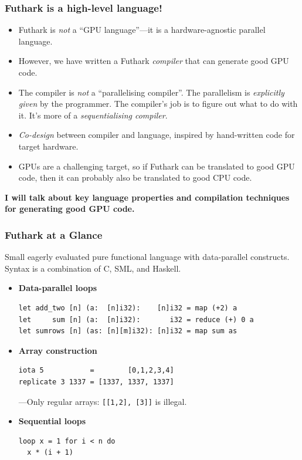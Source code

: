 \documentclass[rgb,dvipsnames]{beamer}
\begin{document}
\begin{frame}
  \frametitle{Futhark is a high-level language!}

  \begin{itemize}
  \item Futhark is \textit{not} a ``GPU language''---it is a
    hardware-agnostic parallel language.
  \item However, we have written a Futhark \textit{compiler} that can
    generate good GPU code.
  \item The compiler is \textit{not} a ``parallelising compiler''.
    The parallelism is \textit{explicitly given} by the programmer.
    The compiler's job is to figure out what to do with it.  It's more
    of a \textit{sequentialising compiler}.
  \item \textit{Co-design} between compiler and language, inspired by
    hand-written code for target hardware.
  \item GPUs are a challenging target, so if Futhark can be translated
    to good GPU code, then it can probably also be translated to good
    CPU code.
  \end{itemize}

  \textbf{I will talk about key language properties and compilation
    techniques for generating good GPU code.}
\end{frame}


\begin{frame}[fragile]
  \frametitle{Futhark at a Glance}

  Small eagerly evaluated pure functional language with data-parallel
  constructs.  Syntax is a combination of C, SML, and Haskell.

  \begin{itemize}
  \item\textbf{Data-parallel loops}
\begin{lstlisting}[xleftmargin=-1cm]
let add_two [n] (a:  [n]i32):    [n]i32 = map (+2) a
let     sum [n] (a:  [n]i32):       i32 = reduce (+) 0 a
let sumrows [n] (as: [n][m]i32): [n]i32 = map sum as
\end{lstlisting}

  \item\textbf{Array construction}
\begin{lstlisting}[xleftmargin=-1cm]
iota 5           =        [0,1,2,3,4]
replicate 3 1337 = [1337, 1337, 1337]
\end{lstlisting}

    \hfill ---Only regular arrays: \lstinline{[[1,2], [3]]} is illegal.

\item\textbf{Sequential loops}
  \begin{lstlisting}[xleftmargin=-1cm]
loop x = 1 for i < n do
  x * (i + 1)
\end{lstlisting}
  \end{itemize}
\end{frame}
\end{document}
